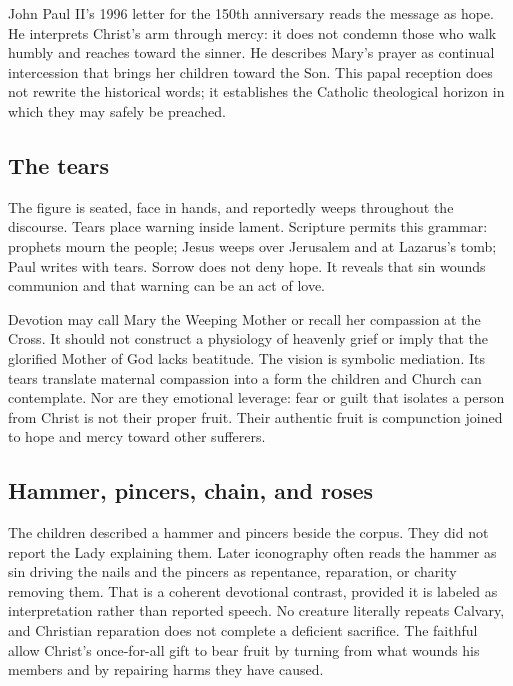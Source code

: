 John Paul II's 1996 letter for the 150th anniversary reads the message as hope. He interprets Christ's arm through mercy: it does not condemn those who walk humbly and reaches toward the sinner. He describes Mary's prayer as continual intercession that brings her children toward the Son. This papal reception does not rewrite the historical words; it establishes the Catholic theological horizon in which they may safely be preached.


\subsection{The tears}

The figure is seated, face in hands, and reportedly weeps throughout the discourse. Tears place warning inside lament. Scripture permits this grammar: prophets mourn the people; Jesus weeps over Jerusalem and at Lazarus's tomb; Paul writes with tears. Sorrow does not deny hope. It reveals that sin wounds communion and that warning can be an act of love.

Devotion may call Mary the Weeping Mother or recall her compassion at the Cross. It should not construct a physiology of heavenly grief or imply that the glorified Mother of God lacks beatitude. The vision is symbolic mediation. Its tears translate maternal compassion into a form the children and Church can contemplate. Nor are they emotional leverage: fear or guilt that isolates a person from Christ is not their proper fruit. Their authentic fruit is compunction joined to hope and mercy toward other sufferers.

\subsection{Hammer, pincers, chain, and roses}

The children described a hammer and pincers beside the corpus. They did not report the Lady explaining them. Later iconography often reads the hammer as sin driving the nails and the pincers as repentance, reparation, or charity removing them. That is a coherent devotional contrast, provided it is labeled as interpretation rather than reported speech. No creature literally repeats Calvary, and Christian reparation does not complete a deficient sacrifice. The faithful allow Christ's once-for-all gift to bear fruit by turning from what wounds his members and by repairing harms they have caused.

